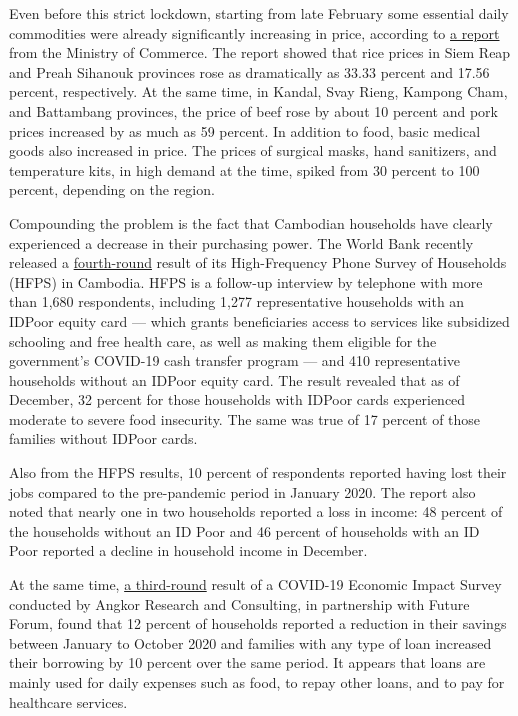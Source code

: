 \documentclass[10pt,a4paper]{letter}
\begin{document}
Even before this strict lockdown, starting from late February some essential daily commodities were already significantly increasing in price, according to \href{https://www.khmertimeskh.com/710643/pandemic-causes-rise-in-consumer-price-index/}{a report} from the Ministry of Commerce. The report showed that rice prices in Siem Reap and Preah Sihanouk provinces rose as dramatically as 33.33 percent and 17.56 percent, respectively. At the same time, in Kandal, Svay Rieng, Kampong Cham, and Battambang provinces, the price of beef rose by about 10 percent and pork prices increased by as much as 59 percent. In addition to food, basic medical goods also increased in price. The prices of surgical masks, hand sanitizers, and temperature kits, in high demand at the time, spiked from 30 percent to 100 percent, depending on the region.

Compounding the problem is the fact that Cambodian households have clearly experienced a decrease in their purchasing power. The World Bank recently released a \href{http://documents1.worldbank.org/curated/en/480321617235189070/pdf/Main-Report.pdf}{fourth-round} result of its High-Frequency Phone Survey of Households (HFPS) in Cambodia. HFPS is a follow-up interview by telephone with more than 1,680 respondents, including 1,277 representative households with an IDPoor equity card --- which grants beneficiaries access to services like subsidized schooling and free health care, as well as making them eligible for the government's COVID-19 cash transfer program --- and 410 representative households without an IDPoor equity card. The result revealed that as of December, 32 percent for those households with IDPoor cards experienced moderate to severe food insecurity. The same was true of 17 percent of those families without IDPoor cards.

Also from the HFPS results, 10 percent of respondents reported having lost their jobs compared to the pre-pandemic period in January 2020. The report also noted that nearly one in two households reported a loss in income: 48 percent of the households without an ID Poor and 46 percent of households with an ID Poor reported a decline in household income in December.

At the same time, \href{http://www.angkorresearch.com/imgs/file/The%20Effect%20of%20Covid-19%20Impacts%20on%20Cambodian%20Development_%20Headline%20Results%20Brief_R3_EN_V4.pdf}{a third-round} result of a COVID-19 Economic Impact Survey conducted by Angkor Research and Consulting, in partnership with Future Forum, found that 12 percent of households reported a reduction in their savings between January to October 2020 and families with any type of loan increased their borrowing by 10 percent over the same period. It appears that loans are mainly used for daily expenses such as food, to repay other loans, and to pay for healthcare services.
\end{document}

